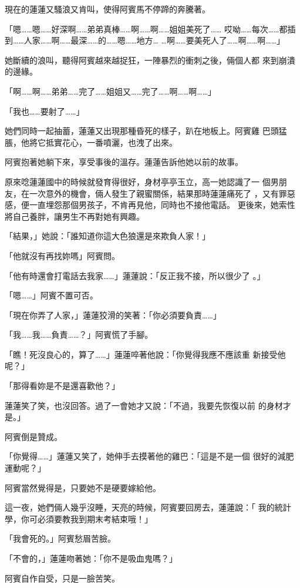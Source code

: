 現在的蓮蓮又騷浪又肯叫，使得阿賓馬不停蹄的奔騰著。

「嗯……嗯……好深啊……弟弟真棒……啊……啊……姐姐美死了……
哎呦……每次……都插到……人家……啊……最深……的……嗯……地方…
…啊……要美死人了……啊……啊……」

她斷續的浪叫，聽得阿賓越來越捉狂，一陣暴烈的衝刺之後，倆個人都
來到崩潰的邊緣。

「啊……啊……弟弟……完了……姐姐又……完了……啊……啊……」

「我也……要射了……」

她們同時一起抽蓄，蓮蓮又出現那種昏死的樣子，趴在地板上。阿賓雞
巴頭猛脹，他將它抵實花心，一番噴灑，也洩了出來。

阿賓抱著她躺下來，享受事後的溫存。蓮蓮告訴他她以前的故事。

原來唸蓮蓮國中的時候就發育得很好，身材亭亭玉立，高一她認識了一
個男朋友，在一次意外的機會，倆人發生了親蜜關係，結果那時蓮蓮痛死了
，又有罪惡感，便一直埋怨那個男孩子，不肯再見他，同時也不接他電話。
更後來，她索性將自己養胖，讓男生不再對她有興趣。

「結果，」她說：「誰知道你這大色狼還是來欺負人家！」

「他就沒有再找妳嗎」阿賓問。

「他有時還會打電話去我家……」蓮蓮說：「反正我不接，所以很少了
。」

「嗯……」阿賓不置可否。

「現在你弄了人家，」蓮蓮狡滑的笑著：「你必須要負責……」

「我……我……負責……？」阿賓慌了手腳。

「瞧！死沒良心的，算了……」蓮蓮啐著他說：「你覺得我應不應該重
新接受他呢？」

「那得看妳是不是還喜歡他？」

蓮蓮笑了笑，也沒回答。過了一會她才又說：「不過，我要先恢復以前
的身材才是。」

阿賓倒是贊成。

「你覺得……」蓮蓮又笑了，她伸手去摸著他的雞巴：「這是不是一個
很好的減肥運動呢？」

阿賓當然覺得是，只要她不是硬要嫁給他。

這一夜，她們倆人幾乎沒睡，天亮的時候，阿賓要回房去，蓮蓮說：「
我的統計學，你可必須要教我到期末考結束哦！」

「我會死的。」阿賓愁眉苦臉。

「不會的，」蓮蓮吻著她：「你不是吸血鬼嗎？」

阿賓自作自受，只是一臉苦笑。











